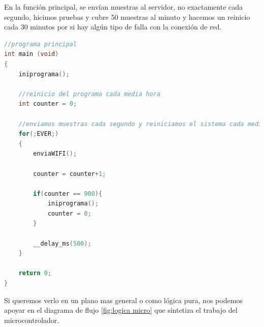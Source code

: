 En la función principal, se envían muestras al servidor, no exactamente cada segundo, hicimos pruebas y cubre 50 muestras al minuto y hacemos un reinicio cada 30 minutos por si hay algún tipo de falla con la conexión de red.

\begin{lstlisting}[language=C]
//programa principal
int main (void)
{     
    iniprograma();

    //reinicio del programa cada media hora
    int counter = 0;
    
    //enviamos muestras cada segundo y reiniciamos el sistema cada media hora
    for(;EVER;)
    {           
        enviaWIFI();
        
        counter = counter+1;
        
        if(counter == 900){
            iniprograma();
            counter = 0;
        }
        
        __delay_ms(500);
    }
    
    return 0;
}
\end{lstlisting}

Si queremos verlo en un plano mas general o como lógica pura, nos podemos apoyar en el diagrama de flujo \ref{fig:logica micro} que sintetiza el trabajo del microcontrolador.

